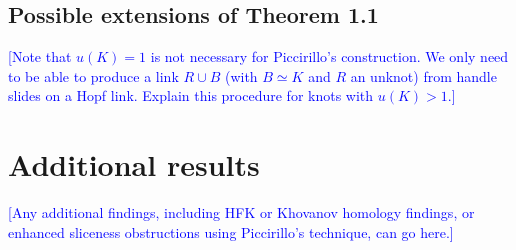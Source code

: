 \documentclass[11pt,usenames,dvipsnames,reqno]{amsart}
\numberwithin{theorem}{section}
\theoremstyle{ex}
\theoremstyle{rem}
\def\kh#1{\textcolor{Blue}{#1}}
\begin{document}
\subsection{Possible extensions of Theorem 1.1} \kh{[Note that $u(K)=1$ is not necessary for Piccirillo's construction. We only need to be able to produce a link $R\cup B$ (with $B\simeq K$ and $R$ an unknot) from handle slides on a Hopf link. Explain this procedure for knots with $u(K)>1$.]}

\section{Additional results}

\kh{[Any additional findings, including HFK or Khovanov homology findings, or enhanced sliceness obstructions using Piccirillo's technique, can go here.]}




\end{document}
